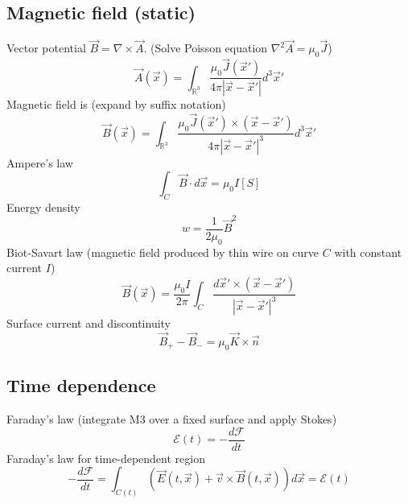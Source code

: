 \documentclass{article}
\theoremstyle{definition}
\theoremstyle{remark}
\theoremstyle{plain}
\theoremstyle{definition}
\newcommand{\RR}{\mathbb{R}}
\begin{document}
\subsection{Magnetic field (static)}
Vector potential $\vec B=\nabla\times\vec A$. (Solve Poisson equation $\nabla^2\vec A=\mu_0\vec J$)
\[\vec A(\vec x)=\int_{\RR^3}\dfrac{\mu_0\vec J(\vec x')}{4\pi|\vec x-\vec x'|}d^3\vec x'\]
Magnetic field is (expand by suffix notation)
\[\vec B(\vec x)=\int_{\RR^3}\dfrac{\mu_0 \vec J(\vec x')\times(\vec x-\vec x')}{4\pi|\vec x-\vec x'|^3}d^3\vec x'\]
Ampere's law
\[\int_C\vec B\cdot d\vec x=\mu_0 I[S]\]
Energy density
\[w=\dfrac{1}{2\mu_0}\vec B^2\]
Biot-Savart law (magnetic field produced by thin wire on curve $C$ with constant current $I$)
\[\vec B(\vec x)=\dfrac{\mu_0I}{2\pi}\int_{C}\dfrac{d\vec x'\times (\vec x-\vec x')}{|\vec x-\vec x'|^3}\]
Surface current and discontinuity
\[\vec B_+-\vec B_-=\mu_0\vec K\times \vec n\]

\subsection{Time dependence}
Faraday's law (integrate M3 over a fixed surface and apply Stokes)
\[\mathcal{E}(t)=-\dfrac{d\mathcal{F}}{dt}\]
Faraday's law for time-dependent region
\[-\dfrac{d\mathcal F}{dt}=\int_{C(t)}(\vec E(t,\vec x)+\vec{v}\times \vec B(t,\vec x))d\vec x=\mathcal E(t)\]
\end{document}
